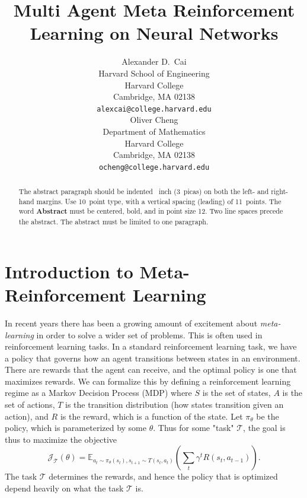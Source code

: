 \documentclass{article}
\title{Multi Agent Meta Reinforcement Learning on Neural Networks}
\author{%
  Alexander D.~Cai \\
  Harvard School of Engineering\\
  Harvard College \\
  Cambridge, MA 02138 \\
  \texttt{alexcai@college.harvard.edu} \\
  \And
  Oliver Cheng \\
  Department of Mathematics \\
  Harvard College \\
  Cambridge, MA 02138 \\
  \texttt{ocheng@college.harvard.edu} \\
}
\begin{document}
\maketitle

\begin{abstract}
  The abstract paragraph should be indented ~inch (3~picas) on
  both the left- and right-hand margins. Use 10~point type, with a vertical
  spacing (leading) of 11~points.  The word \textbf{Abstract} must be centered,
  bold, and in point size 12. Two line spaces precede the abstract. The abstract
  must be limited to one paragraph.\cite{wang2018pfc}
\end{abstract}
\section{Introduction to Meta-Reinforcement Learning}

In recent years there has been a growing amount of excitement about 
\textit{meta-learning} in order to solve a wider set of problems. This is 
often used in reinforcement learning tasks. In a standard reinforcement
 learning task, we have a policy that governs how an agent transitions 
between states in an environment. There are rewards that the agent can 
receive, and the optimal policy is one that maximizes rewards. We can 
formalize this by defining a reinforcement learning regime as a Markov 
Decision Process (MDP) where $S$ is the set of states, $A$ is the set 
of actions, $T$ is the transition distribution (how states transition given 
an action), and $R$ is the reward, which is a function of the state. Let 
$\pi_\theta$ be the policy, which is parameterized by some $\theta$. 
Thus for some "task" $\mathcal{T}$, the goal is thus to maximize the objective 
\[ \mathcal{J}_{\mathcal{T}}(\theta) = \mathbb{E}_{a_t \sim \pi_\theta(s_t), s_{t+1}
 \sim T(s_t, a_t)} \left( \sum_t \gamma^t R(s_t, a_{t-1}) \right).\]
The task $\mathcal{T}$ determines the rewards, and hence the policy that is optimized 
depend heavily on what the task $\mathcal{T}$ is. 
\end{document}
